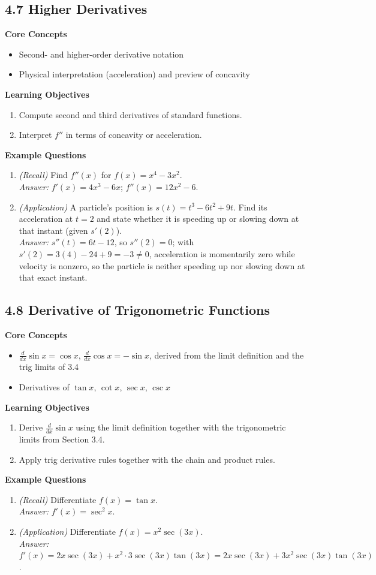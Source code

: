 \documentclass[11pt]{article}
\begin{document}
\subsection{4.7 Higher Derivatives}
\textbf{Core Concepts}
\begin{itemize}
\item Second- and higher-order derivative notation
\item Physical interpretation (acceleration) and preview of concavity
\end{itemize}
\textbf{Learning Objectives}
\begin{enumerate}
\item Compute second and third derivatives of standard functions.
\item Interpret $f''$ in terms of concavity or acceleration.
\end{enumerate}
\textbf{Example Questions}
\begin{enumerate}
\item \emph{(Recall)} Find $f''(x)$ for $f(x) = x^4 - 3x^2$. \\
\textit{Answer:} $f'(x) = 4x^3-6x$; $f''(x) = 12x^2-6$.
\item \emph{(Application)} A particle's position is $s(t) = t^3-6t^2+9t$. Find its acceleration at $t=2$ and state whether it is speeding up or slowing down at that instant (given $s'(2)$). \\
\textit{Answer:} $s''(t)=6t-12$, so $s''(2)=0$; with $s'(2)=3(4)-24+9=-3\ne0$, acceleration is momentarily zero while velocity is nonzero, so the particle is neither speeding up nor slowing down at that exact instant.
\end{enumerate}

\subsection{4.8 Derivative of Trigonometric Functions}
\textbf{Core Concepts}
\begin{itemize}
\item $\frac{d}{dx}\sin x=\cos x$, $\frac{d}{dx}\cos x=-\sin x$, derived from the limit definition and the trig limits of 3.4
\item Derivatives of $\tan x$, $\cot x$, $\sec x$, $\csc x$
\end{itemize}
\textbf{Learning Objectives}
\begin{enumerate}
\item Derive $\frac{d}{dx}\sin x$ using the limit definition together with the trigonometric limits from Section 3.4.
\item Apply trig derivative rules together with the chain and product rules.
\end{enumerate}
\textbf{Example Questions}
\begin{enumerate}
\item \emph{(Recall)} Differentiate $f(x)=\tan x$. \\
\textit{Answer:} $f'(x) = \sec^2 x$.
\item \emph{(Application)} Differentiate $f(x) = x^2\sec(3x)$. \\
\textit{Answer:} $f'(x) = 2x\sec(3x) + x^2\cdot 3\sec(3x)\tan(3x) = 2x\sec(3x)+3x^2\sec(3x)\tan(3x)$.
\end{enumerate}
\end{document}
